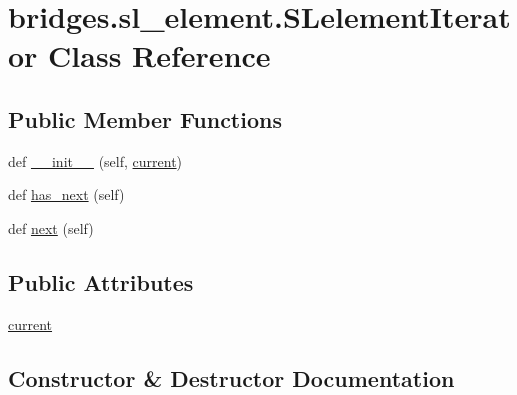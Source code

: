 \hypertarget{classbridges_1_1sl__element_1_1_s_lelement_iterator}{}\section{bridges.\+sl\+\_\+element.\+S\+Lelement\+Iterator Class Reference}
\label{classbridges_1_1sl__element_1_1_s_lelement_iterator}
\subsection*{Public Member Functions}
\begin{DoxyCompactItemize}
\item 
def \hyperlink{classbridges_1_1sl__element_1_1_s_lelement_iterator_a5c49635ad1176439528490757be9ad24}{\+\_\+\+\_\+init\+\_\+\+\_\+} (self, \hyperlink{classbridges_1_1sl__element_1_1_s_lelement_iterator_a073e2b7010880fcb17a505039f7a5eae}{current})
\item 
def \hyperlink{classbridges_1_1sl__element_1_1_s_lelement_iterator_ac5f1f9eaf1b81f486d36d7191dcc3b99}{has\+\_\+next} (self)
\item 
def \hyperlink{classbridges_1_1sl__element_1_1_s_lelement_iterator_af78a36c4fa6a437fe2fee6e00c07f7d6}{next} (self)
\end{DoxyCompactItemize}
\subsection*{Public Attributes}
\begin{DoxyCompactItemize}
\item 
\hyperlink{classbridges_1_1sl__element_1_1_s_lelement_iterator_a073e2b7010880fcb17a505039f7a5eae}{current}
\end{DoxyCompactItemize}


\subsection{Constructor \& Destructor Documentation}
\mbox{\label{classbridges_1_1sl__element_1_1_s_lelement_iterator_a5c49635ad1176439528490757be9ad24}} 
